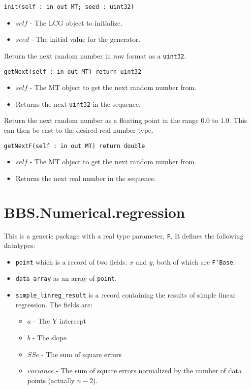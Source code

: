 \documentclass[10pt, openany]{book}
\newcommand{\function}[1]{\texttt{#1}}
\newcommand{\datatype}[1]{\texttt{#1}}
\begin{document}
\function{init(self : in out MT; seed : uint32)}
\begin{itemize}
  \item $self$ - The LCG object to initialize.
  \item $seed$ - The initial value for the generator.
\end{itemize}

Return the next random number in raw format as a \datatype{uint32}.

\function{getNext(self : in out MT) return uint32}
\begin{itemize}
  \item $self$ - The MT object to get the next random number from.
  \item Returns the next \datatype{uint32} in the sequence.
\end{itemize}

Return the next random number as a floating point in the range 0.0 to 1.0.  This can then be cast to the desired real number type.

\function{getNextF(self : in out MT) return double}
\begin{itemize}
  \item $self$ - The MT object to get the next random number from.
  \item Returns the next real number in the sequence.
\end{itemize}

\section{BBS.Numerical.regression}
This is a generic package with a real type parameter, \datatype{F}.  It defines the following datatypes:
\begin{itemize}
  \item \datatype{point} which is a record of two fields: $x$ and $y$, both of which are \datatype{F'Base}.
  \item \datatype{data\_array} as an array of \datatype{point}.
  \item \datatype{simple\_linreg\_result} is a record containing the results of simple linear regression.  The fields are:
  \begin{itemize}
    \item $a$ - The Y intercept
    \item $b$ - The slope
    \item $SSe$ - The sum of square errors
    \item $variance$ - The sum of square errors normalized by the number of data points (actually $n-2$).
  \end{itemize}
\end{itemize}
\end{document}
